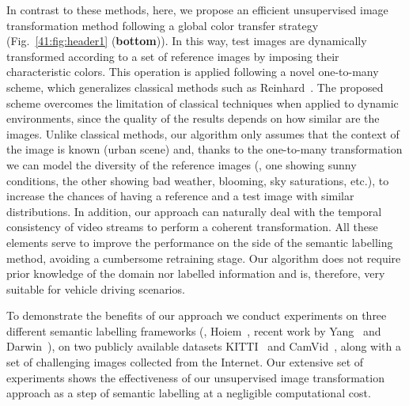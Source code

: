 In contrast to these methods, here, we propose an efficient
unsupervised image transformation method following a global color
transfer strategy (Fig.~\ref{41:fig:header1} (\textbf{bottom})). In this way, test images are dynamically
transformed according to a set of reference images by imposing
their characteristic colors. This operation is applied following a
novel one-to-many scheme, which generalizes classical methods such
as Reinhard~\cite{Reinhard:2001}. The proposed scheme overcomes
the limitation of classical techniques when applied to dynamic
environments, since the quality of the results depends on how
similar are the images. Unlike classical methods, our algorithm
only assumes that the context of the image is known (urban scene)
and, thanks to the one-to-many transformation we can model the
diversity of the reference images (\ie, one showing sunny
conditions, the other showing bad weather, blooming, sky
saturations, etc.), to increase the chances of having a
reference and a test image with similar distributions. In
addition, our approach can naturally deal with the temporal
consistency of video streams to perform a coherent transformation.
All these elements serve to improve the performance on the side of
the  semantic labelling method, avoiding a cumbersome retraining
stage. Our algorithm does not require prior knowledge of the
domain nor labelled information and is, therefore, very suitable
for vehicle driving scenarios.


To demonstrate the benefits of our approach we conduct experiments
on three different semantic labelling frameworks (\ie,
Hoiem~\cite{HoiemIJCV:2007}, recent work by
Yang~\cite{Make3dCVPR:2014} and Darwin~\cite{DARWIN}), on two
publicly available datasets KITTI~\cite{KITTI} and
CamVid~\cite{CamVidBBDD:PRL2008}, along with a set of challenging
images collected from the Internet. Our extensive set of
experiments shows the effectiveness of our unsupervised
image transformation approach as a step of semantic
labelling at a negligible computational cost.
